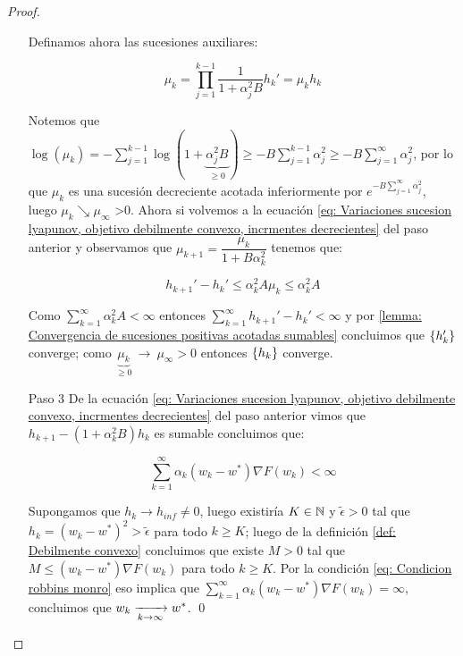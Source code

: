 \begin{proof}
\begin{enumerate}
		Definamos ahora las sucesiones auxiliares:
		
		\begin{subequations}
			\begin{equation}
				\mu_k = \prod\limits_{j=1}^{k-1} {\dfrac{1}{1 + \alpha_j^2B}}
			\end{equation}
			\begin{equation}
				h_k' = \mu_k h_k
			\end{equation}
		\end{subequations}
		
		Notemos que $\log (\mu_k) = - \sum\limits_{j=1}^{k-1} {\log \left(1 + \underbrace{\alpha_j^2 B}_{\geq 0}\right)} \geq - B\sum\limits_{j=1}^{k-1} {\alpha_j^2} \geq -B \sum\limits_{j=1}^{\infty} {\alpha_j^2}$, por lo que $\mu_k$ es una sucesi\'on decreciente acotada inferiormente por $e^{-B \sum\limits_{j=1}^{\infty} {\alpha_j^2}}$, luego $\mu_k \searrow \mu_{\infty}$ >0. Ahora si volvemos  a la ecuaci\'on \ref{eq: Variaciones sucesion lyapunov, objetivo debilmente convexo, incrmentes decrecientes} del paso anterior y observamos que $\mu_{k+1} = \dfrac{\mu_k}{1 + B \alpha_k^2}$ tenemos que:
		
		\begin{equation*}
			h_{k+1}' - h_{k}' \leq \alpha_k^2 A \mu_k \leq \alpha_k^2 A
		\end{equation*}
		
		Como $\sum\limits_{k=1}^{\infty} {\alpha_k^2 A} < \infty$ entonces $\sum\limits_{k=1}^{\infty}{h_{k+1}' - h_{k}'} < \infty$ y por \ref{lemma: Convergencia de sucesiones positivas acotadas sumables} concluimos que $\left\lbrace h_k'\right\rbrace$ converge; como $\underbrace{\mu_k}_{\geq 0} \ \rightarrow \ \mu_{\infty} > 0$ entonces $\left\lbrace h_k\right\rbrace$ converge.
		
		\item[Paso 3] De la ecuaci\'on \ref{eq: Variaciones sucesion lyapunov, objetivo debilmente convexo, incrmentes decrecientes} del paso anterior vimos que $	h_{k+1} - \left(1 + \alpha_k^2 B\right)h_k$ es sumable concluimos que:
		
		\begin{equation*}
			\sum\limits_{k=1}^{\infty} {\alpha_k \left(w_k - w^* \right)\nabla F(w_k)} < \infty
		\end{equation*}
		
		Supongamos que $h_k \rightarrow h_{inf} \neq 0$, luego existir\'ia $K\in {\mathbb{N}}$ y $\widetilde{\epsilon} >0$ tal que $h_k = \left(w_k - w^*\right)^2 > \widetilde{\epsilon}$ para todo $k \geq K$; luego de la definici\'on \ref{def: Debilmente convexo} concluimos que existe $M > 0$ tal que $M \leq \left(w_k - w^* \right)\nabla F(w_k) $ para todo $k \geq K$. Por la condici\'on \ref{eq: Condicion robbins monro} eso implica que $\sum\limits_{k=1}^{\infty} {\alpha_k \left(w_k - w^* \right)\nabla F(w_k)} = \infty$, concluimos que $w_k \xrightarrow[k \rightarrow \infty]{} w^*$. \qed
		
	\end{enumerate}
	
\end{proof}

